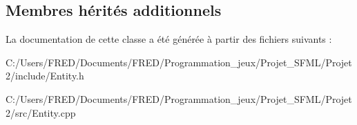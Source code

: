 \subsection*{Membres hérités additionnels}


La documentation de cette classe a été générée à partir des fichiers suivants \+:\begin{DoxyCompactItemize}
\item 
C\+:/\+Users/\+F\+R\+E\+D/\+Documents/\+F\+R\+E\+D/\+Programmation\+\_\+jeux/\+Projet\+\_\+\+S\+F\+M\+L/\+Projet2/include/Entity.\+h\item 
C\+:/\+Users/\+F\+R\+E\+D/\+Documents/\+F\+R\+E\+D/\+Programmation\+\_\+jeux/\+Projet\+\_\+\+S\+F\+M\+L/\+Projet2/src/Entity.\+cpp\end{DoxyCompactItemize}
